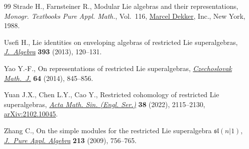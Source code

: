 \documentclass[pdftex]{sigma}
\numberwithin{equation}{section}
\begin{document}
\begin{thebibliography}{99}
Strade H., Farnsteiner R., Modular {L}ie algebras and their representations,
 \textit{Monogr. Textbooks Pure Appl. Math.}, Vol.~116, \href{https://doi.org/10.1201/9781003065630}{Marcel Dekker}, Inc.,
 New York, 1988.

Usefi H., Lie identities on enveloping algebras of restricted {L}ie
 superalgebras, \href{https://doi.org/10.1016/j.jalgebra.2013.06.026}{\textit{J.~Algebra}} \textbf{393} (2013), 120--131.

Yao Y.-F., On representations of restricted {L}ie superalgebras,
\href{https://doi.org/10.1007/s10587-014-0137-2}{\textit{Czechoslovak Math.~J.}} \textbf{64} (2014), 845--856.

Yuan J.X., Chen L.Y., Cao Y., Restricted cohomology of restricted {L}ie
 superalgebras, \href{https://doi.org/10.1007/s10114-022-1088-4}{\textit{Acta Math. Sin. (Engl. Ser.)}} \textbf{38} (2022),
 2115--2130, \href{https://arxiv.org/abs/2102.10045}{arXiv:2102.10045}.

Zhang C., On the simple modules for the restricted {L}ie superalgebra
 {${\mathfrak{sl}}(n|1)$}, \href{https://doi.org/10.1016/j.jpaa.2008.09.005}{\textit{J.~Pure Appl. Algebra}} \textbf{213} (2009),
 756--765.

\end{thebibliography}

\LastPageEnding
\end{document}
